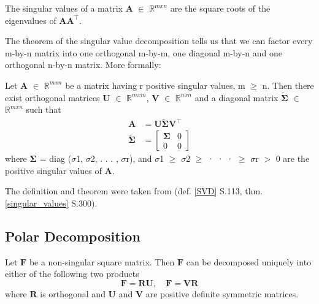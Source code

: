 \begin{definition}
\label{singular_values}
The singular values of a matrix $\mathbf{A}$ $\in$ $\mathbb{R}^{m x n}$ are the square roots of the eigenvalues of $\mathbf{AA}^{\intercal}$.
\end{definition}

The theorem of the singular value decomposition tells us that we can factor every m-by-n matrix into one orthogonal m-by-m, one diagonal m-by-n and one orthogonal n-by-n matrix. More formally:

\begin{theorem}
\label{SVD}
Let $\mathbf{A}$ $\in$ $\mathbb{R}^{m x n}$ be a matrix having r positive singular values, m $\geq$ n. Then there exist orthogonal matrices $\mathbf{U}$ $\in$ $\mathbb{R}^{m x m}$, $\mathbf{V}$ $\in$ $\mathbb{R}^{n x n}$ and a diagonal matrix $\mathbf{\tilde{\Sigma}}$ $\in$ $\mathbb{R}^{m x n}$ such that
\begin{align*}
\mathbf{A} &= \mathbf{U \tilde{\Sigma} V^\intercal} \\
\mathbf{\tilde{\Sigma}} &= \left[ \begin{array}{cc} \mathbf{\Sigma} & 0 \\ 0 & 0 \end{array} \right]
\end{align*}
where $\mathbf{\Sigma}$ = diag ($\sigma$1, $\sigma$2, . . . , $\sigma$r), and $\sigma$1 $\geq$ $\sigma$2 $\geq$ · · · $\geq$ $\sigma$r $>$ 0 are the positive singular values of $\mathbf{A}$.

\end{theorem}
The definition and theorem were taken from \cite{ford2014numerical} (def. \ref{SVD} S.113, thm. \ref{singular_values} S.300).




\subsection{Polar Decomposition}

\begin{theorem}
\label{PD}

Let $\mathbf{F}$ be a non-singular square matrix. Then $\mathbf{F}$ can be decomposed uniquely into either of the following two products
\[
\mathbf{F} = \mathbf{RU}, \quad \mathbf{F} = \mathbf{VR}
\]
where $\mathbf{R}$ is orthogonal and $\mathbf{U}$ and $\mathbf{V}$ are positive definite symmetric matrices.
\end{theorem}

